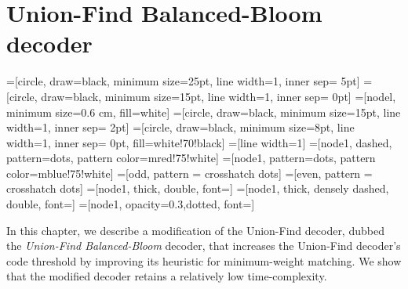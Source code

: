 \chapter{Union-Find Balanced-Bloom decoder}\label{ch:ufbb}

=[circle, draw=black, minimum size=25pt, line width=1, inner sep= 5pt]
=[circle, draw=black, minimum size=15pt, line width=1, inner sep= 0pt]
=[nodel, minimum size=0.6 cm, fill=white]
=[circle, draw=black, minimum size=15pt, line width=1, inner sep= 2pt]
=[circle, draw=black, minimum size=8pt, line width=1, inner sep= 0pt, fill=white!70!black]
=[line width=1]
\tikzfading[name=fade right, left color=transparent!0, right color=transparent!100]
=[node1, dashed, pattern=dots, pattern color=mred!75!white]
=[node1, pattern=dots, pattern color=mblue!75!white]
=[odd, pattern = crosshatch dots]
=[even, pattern = crosshatch dots]
=[node1, thick, double, font=\footnotesize]
=[node1, thick, densely dashed, double, font=\footnotesize]
=[node1, opacity=0.3,dotted, font=\footnotesize]


In this chapter, we describe a modification of the Union-Find decoder, dubbed the \emph{Union-Find Balanced-Bloom} decoder, that increases the Union-Find decoder's code threshold by improving its heuristic for minimum-weight matching. We show that the modified decoder retains a relatively low time-complexity. 

